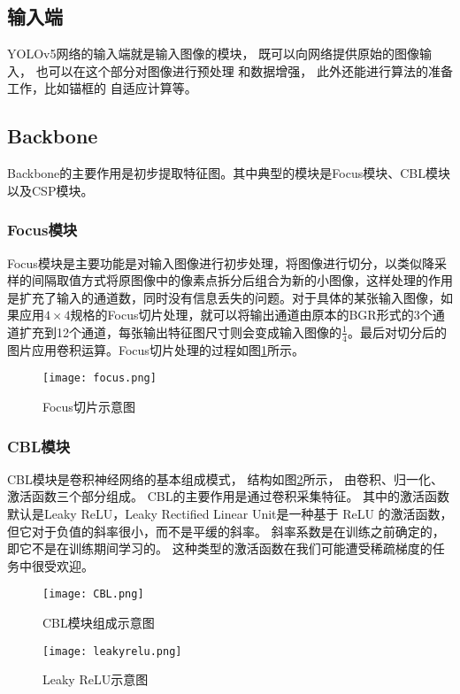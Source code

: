 \subsection{输入端}
YOLOv5网络的输入端就是输入图像的模块，
既可以向网络提供原始的图像输入，
也可以在这个部分对图像进行预处理
和数据增强，
此外还能进行算法的准备工作，比如锚框的
自适应计算等。

\subsection{Backbone}
Backbone的主要作用是初步提取特征图。其中典型的模块是Focus模块、CBL模块以及CSP模块。

\subsubsection{Focus模块}
Focus模块是主要功能是对输入图像进行初步处理，将图像进行切分，以类似降采样的间隔取值方式将原图像中的像素点拆分后组合为新的小图像，这样处理的作用是扩充了输入的通道数，同时没有信息丢失的问题。对于具体的某张输入图像，如果应用$4\times4$规格的Focus切片处理，就可以将输出通道由原本的BGR形式的3个通道扩充到12个通道，每张输出特征图尺寸则会变成输入图像的$\frac{1}{4}$。最后对切分后的图片应用卷积运算。Focus切片处理的过程如图\ref{focus}所示。

\begin{figure}[h]
  \centering
  \texttt{[image: focus.png]}
  \caption{Focus切片示意图}
  \label{focus}
\end{figure}

\subsubsection{CBL模块}
CBL模块是卷积神经网络的基本组成模式，
结构如图\ref{cbl}所示，
由卷积、归一化、激活函数三个部分组成。
CBL的主要作用是通过卷积采集特征。
其中的激活函数默认是Leaky ReLU，Leaky Rectified Linear Unit是一种基于 ReLU 的激活函数，但它对于负值的斜率很小，而不是平缓的斜率。 斜率系数是在训练之前确定的，即它不是在训练期间学习的。 这种类型的激活函数在我们可能遭受稀疏梯度的任务中很受欢迎。

\begin{figure}[h]
  \centering
  \texttt{[image: CBL.png]}
  \caption{CBL模块组成示意图}
  \label{cbl}
\end{figure}

\begin{figure}[h]
  \centering
  \texttt{[image: leakyrelu.png]}
  \caption{Leaky ReLU示意图}
  \label{relu}
\end{figure}

